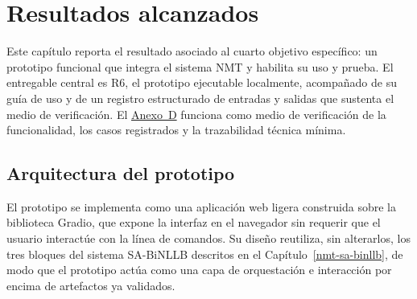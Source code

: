 \documentclass[12pt,a4paper,oneside]{book}
\begin{document}
\section{Resultados alcanzados}\label{prototipo-resultados-alcanzados}

Este capítulo reporta el resultado asociado al cuarto objetivo específico: un prototipo funcional que integra el sistema NMT y habilita su uso y prueba. El entregable central es R6, el prototipo ejecutable localmente, acompañado de su guía de uso y de un registro estructurado de entradas y salidas que sustenta el medio de verificación. El \hyperref[anexo-prototipo]{Anexo~D} funciona como medio de verificación de la funcionalidad, los casos registrados y la trazabilidad técnica mínima.

\subsection{Arquitectura del prototipo}\label{prototipo-arquitectura}

El prototipo se implementa como una aplicación web ligera construida sobre la biblioteca Gradio, que expone la interfaz en el navegador sin requerir que el usuario interactúe con la línea de comandos. Su diseño reutiliza, sin alterarlos, los tres bloques del sistema SA-BiNLLB descritos en el Capítulo~\ref{nmt-sa-binllb}, de modo que el prototipo actúa como una capa de orquestación e interacción por encima de artefactos ya validados.
\end{document}
